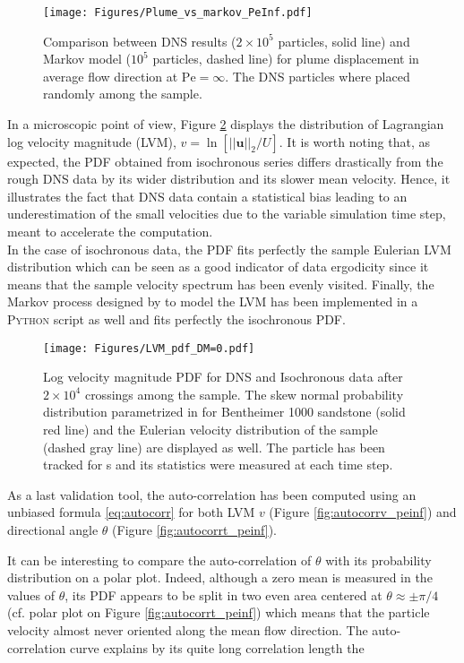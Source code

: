 \begin{figure}[h!]
	\centering
	\texttt{[image: Figures/Plume\_vs\_markov\_PeInf.pdf]}
	\caption{Comparison between DNS results ($2\times 10^5$ particles, solid line) and Markov model ($10^5$ particles, dashed line) for plume displacement in average flow direction at $\mathrm{Pe}=\infty$. The DNS particles where placed randomly among the sample.}
	\label{fig:plume_peinf}
\end{figure}

In a microscopic point of view, Figure \ref{fig:lvm_pdf_peinf} displays the distribution of Lagrangian log velocity magnitude (LVM), $v = \ln[||\textbf{u}||_2/U]$. 
It is worth noting that, as expected, the PDF obtained from isochronous series differs drastically from the rough DNS data by its wider distribution and its slower mean velocity.
Hence, it illustrates the fact that DNS data contain a statistical bias leading to an underestimation of the small velocities due to the variable simulation time step, meant to accelerate the computation.\\
In the case of isochronous data, the PDF fits perfectly the sample Eulerian LVM distribution which can be seen as a good indicator of data ergodicity since it means that the sample velocity spectrum has been evenly visited.
Finally, the Markov process designed by \cite{Meyer2016} to model the LVM has been implemented in a \textsc{Python} script as well and fits perfectly the isochronous PDF.

\begin{figure}
	\centering
	\texttt{[image: Figures/LVM\_pdf\_DM=0.pdf]}
	\caption{Log velocity magnitude PDF for DNS and Isochronous data after $2\times 10^4$ crossings among the sample. The skew normal probability distribution parametrized in \citet{Meyer2016} for Bentheimer 1000 sandstone (solid red line) and the Eulerian velocity distribution of the sample (dashed gray line) are displayed as well. The particle has been tracked for s and its statistics were measured at each time step.}
	\label{fig:lvm_pdf_peinf}
\end{figure}

As a last validation tool, the auto-correlation has been computed using an unbiased formula \eqref{eq:autocorr} for both LVM $v$ (Figure \ref{fig:autocorrv_peinf}) and directional angle $\theta$ (Figure \ref{fig:autocorrt_peinf}). 

It can be interesting to compare the auto-correlation of $\theta$ with its probability distribution on a polar plot. 
Indeed, although a zero mean is measured in the values of $\theta$, its PDF appears to be split in two even area centered at $\theta\approx\pm\pi/4$ (cf. polar plot on Figure \ref{fig:autocorrt_peinf}) which means that the particle velocity almost never oriented along the mean flow direction.
The auto-correlation curve explains by its quite long correlation length the  



